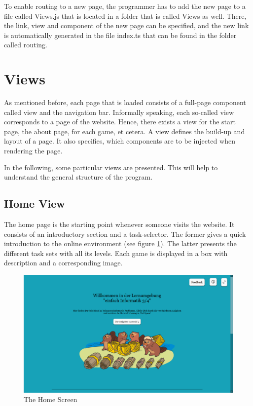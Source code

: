 To enable routing to a new page, the programmer has to add the new page to a file called Views.js that is located in a folder that is called Views as well. There, the link, view and component of the new page can be specified, and the new link is automatically generated in the file index.ts that can be found in the folder called routing.

\section{Views}
\label{section:views}

As mentioned before, each page that is loaded consists of a full-page component called view and the navigation bar. Informally speaking, each so-called view corresponds to a page of the website.  Hence, there exists a view for the start page, the about page, for each game, et cetera. A view defines the build-up and layout of a page. It also specifies, which components are to be injected when rendering the page.

In the following, some particular views are presented. This will help to understand the general structure of the program.

\subsection{Home View}
The home page is the starting point whenever someone visits the website. It consists of an introductory section and a task-selector. The former gives a quick introduction to the online environment  (see figure \ref{fig:homescreen}). The latter presents the different task sets with all its levels. Each game is displayed in a box with description and a corresponding image.

\begin{figure}[H]
    \centering
    \includegraphics[width=1.0 \columnwidth]{figures/homescreen.png}
    \caption{The Home Screen} 
    \label{fig:homescreen} 
\end{figure}

